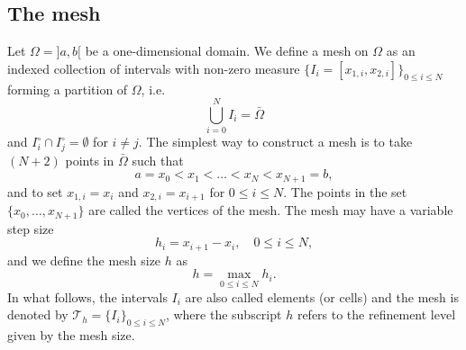 \subsection{The mesh}
Let $\Omega = ]a, b[$ be a one-dimensional domain. We define a mesh on $\Omega$ as an indexed collection of intervals with non-zero measure $\{I_i = [x_{1,i}, x_{2,i}]\}_{0 \leq i \leq N}$ forming a partition of $\Omega$, i.e.
\begin{equation*}
\bigcup_{i=0}^N I_i = \bar{\Omega}
\end{equation*}
and $I_i^\circ \cap I_j^\circ = \emptyset$ for $i \neq j$.
The simplest way to construct a mesh is to take $(N+2)$ points in $\bar{\Omega}$ such that
\begin{equation*}
a = x_0 < x_1 < \dots < x_N < x_{N+1} = b,
\end{equation*}
and to set $x_{1,i} = x_i$ and $x_{2,i} = x_{i+1}$ for $0 \le i \le N$. The points in the set $\{x_0, \dots, x_{N+1}\}$ are called the vertices of the mesh. The mesh may have a variable step size
\begin{equation*}
h_i = x_{i+1} - x_i, \quad 0 \leq i \le N,
\end{equation*}
and we define the mesh size $h$ as
\begin{equation*}
h = \max_{0 \le i \le N} h_i.
\end{equation*}
In what follows, the intervals $I_i$ are also called elements (or cells) and the mesh is denoted by $\mathcal{T}_h = \{I_i\}_{0 \le i \le N}$, where the subscript $h$ refers to the refinement level given by the mesh size.

